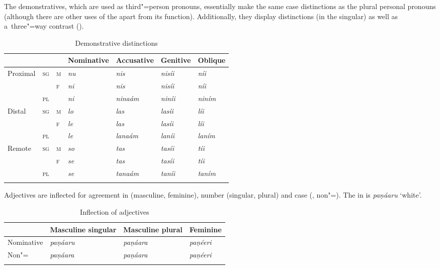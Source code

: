 The demonstratives, which are used as third"=person pronouns, essentially make the same case distinctions as the plural personal pronouns (although there are other uses of the  apart from its  function). Additionally, they display  distinctions (in the  singular) as well as a~three"=way  contrast ().


\begin{table}[htb]
\caption{Demonstrative distinctions}
\begin{tabularx}{\textwidth}{ l l l Q Q Q Q }
\lsptoprule
&
&
&
Nominative &
Accusative &
Genitive &
Oblique \\\midrule
Proximal &
\textsc{sg} &
\textsc{m} &
\textit{nu} &
\textit{nis} &
\textit{nisíi} &
\textit{níi} \\
&
&
\textsc{f} &
\textit{ni} &
\textit{nis} &
\textit{nisíi} &
\textit{níi} \\
&
\textsc{pl} &
&
\textit{ni} &
\textit{ninaám} &
\textit{niníi} &
\textit{niním} \\
Distal &
\textsc{sg} &
\textsc{m} &
\textit{lo} &
\textit{las} &
\textit{lasíi} &
\textit{líi} \\
&
&
\textsc{f} &
\textit{le} &
\textit{las} &
\textit{lasíi} &
\textit{líi} \\
&
\textsc{pl} &
&
\textit{le} &
\textit{lanaám} &
\textit{laníi} &
\textit{laním} \\
Remote &
\textsc{sg} &
\textsc{m} &
\textit{so} &
\textit{tas} &
\textit{tasíi} &
\textit{tíi} \\
&
&
\textsc{f} &
\textit{se} &
\textit{tas} &
\textit{tasíi} &
\textit{tíi} \\
&
\textsc{pl} &
&
\textit{se} &
\textit{tanaám} &
\textit{taníi} &
\textit{taním} \\\lspbottomrule
\end{tabularx}
\label{tab:2-dem}
\end{table}


Adjectives are inflected for agreement in  (masculine, feminine), number (singular, plural) and case (, non"=). The  in  is \textit{paṇáaru} `white'.


\begin{table}[t]
\caption{Inflection of adjectives}
\begin{tabularx}{\textwidth}{ l l l Q }
\lsptoprule
&
Masculine singular &
Masculine plural &
Feminine\\\midrule
Nominative &
\textit{paṇáaru} &
\textit{paṇáara} &
\textit{paṇéeri} \\
Non"= &
\textit{paṇáara} &
\textit{paṇáara} &
\textit{paṇéeri} \\\lspbottomrule
\end{tabularx}
\label{tab:2-adj}
\end{table}


